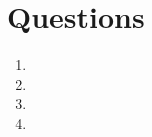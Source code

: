 \documentclass[letterpaper,11pt,titlepage]{article}
\begin{document}
\begin{table}[!hbp]
\begin{tabular}{|c|}

\hline

\hline

\hline

\hline

\hline

\hline

\hline

\hline

\hline
 
 
\end{tabular}
\end{table}


\section{Questions}
\begin{enumerate}

\item

\item 
\item 

\item 
\end{enumerate} 
\end{document}
